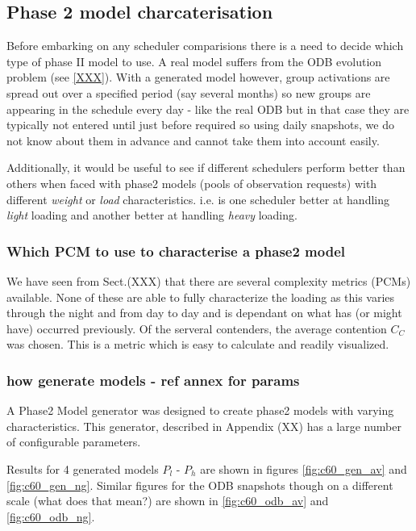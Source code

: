 \subsection{Phase 2 model charcaterisation}
Before embarking on any scheduler comparisions there is a need to decide which type of phase II model to use. A real model suffers from the ODB evolution problem (see \ref{XXX}). With a generated model however, group activations are spread out over a specified period (say several months) so new groups are appearing in the schedule every day - like the real ODB but in that case they are typically not entered until just before required so using daily snapshots, we do not know about them in advance and cannot take them into account easily.
   

Additionally, it would be useful to see if different schedulers perform better than others when faced with phase2 models (pools of observation requests) with different \emph{weight} or \emph{load} characteristics.  i.e. is one scheduler better at handling \emph{light} loading and another better at handling \emph{heavy} loading.

\subsubsection{Which PCM to use to characterise a phase2 model} 
We have seen from Sect.(XXX) that there are several complexity metrics (PCMs) available. None of these are able to fully characterize the loading as this varies through the night and from day to day and is dependant on what has (or might have) occurred previously. Of the serveral contenders, the average contention $C_C$ was chosen. This is a metric which is easy to calculate and readily visualized.
 
\subsubsection{how generate models - ref annex for params} 
A Phase2 Model generator was designed to create phase2 models with varying characteristics. This generator, described in Appendix (XX) has a large number of configurable parameters. 


Results for 4 generated models $P_l$ - $P_h$ are shown in figures \ref{fig:c60_gen_av} and \ref{fig:c60_gen_ng}. Similar figures for the ODB snapshots though on a different scale (what does that mean?) are shown in \ref{fig:c60_odb_av} and \ref{fig:c60_odb_ng}.

